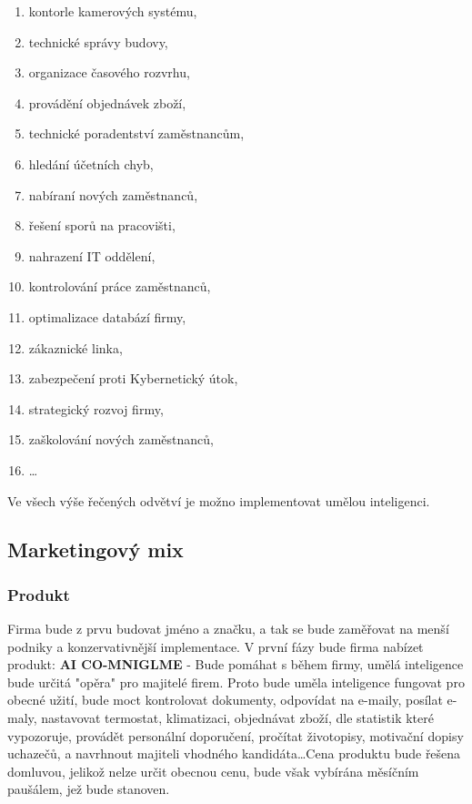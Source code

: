 \documentclass[a4paper,12pt]{report}
\begin{document}
\begin{enumerate}
    \item kontorle kamerových systému,
    \item technické správy budovy,
    \item organizace časového rozvrhu,
    \item provádění objednávek zboží,
    \item technické poradentství zaměstnancům,
    \item hledání účetních chyb,
    \item nabíraní nových zaměstnanců,
    \item řešení sporů na pracovišti,
    \item nahrazení IT oddělení,
    \item kontrolování práce zaměstnanců,
    \item optimalizace databází firmy,
    \item zákaznické linka,
    \item zabezpečení proti Kybernetický útok,
    \item strategický rozvoj firmy,
    \item zaškolování nových zaměstnanců,
    \item \dots
\end{enumerate}

Ve všech výše řečených odvětví je možno implementovat umělou inteligenci.

\newpage

\subsection{Marketingový mix}
\subsubsection{Produkt}
Firma bude z prvu budovat jméno a značku, a tak se bude zaměřovat na menší podniky a konzervativnější implementace.
V první fázy bude firma nabízet produkt: \textbf{AI CO-MNIGLME} - Bude pomáhat s během firmy, umělá inteligence bude
určitá "opěra" pro majitelé firem. Proto bude uměla inteligence fungovat pro obecné užití, bude moct kontrolovat
dokumenty, odpovídat na e-maily, posílat e-maly, nastavovat termostat, klimatizaci, objednávat zboží, dle statistik 
které vypozoruje, provádět personální doporučení, pročítat životopisy, motivační dopisy uchazečů, a navrhnout majiteli
vhodného kandidáta\dots Cena produktu bude řešena domluvou, jelikož nelze určit obecnou cenu, bude však vybírána měsíčním
paušálem, jež bude stanoven. 
\end{document}
